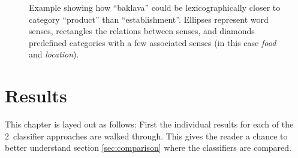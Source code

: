 \documentclass[a4paper,11pt]{kth-mag}
\newcommand{\numClassifierAproaches}{2}
\begin{document}
\begin{figure}[t]
  \centering
  \caption{Example showing how ``baklava'' could be lexicographically closer to category ``product'' than ``establishment''. Ellipses represent word senses, rectangles the relations between senses, and diamonds predefined categories with a few associated senses (in this case \emph{food} and \emph{location}).}
  \label{fig:baklava_lex}
\end{figure}






\chapter{Results}

This chapter is layed out as follows: First the individual results for each of the \numClassifierAproaches~classifier approaches are walked through. This gives the reader a chance to better understand section \ref{sec:comparison} where the classifiers are compared.
\end{document}
